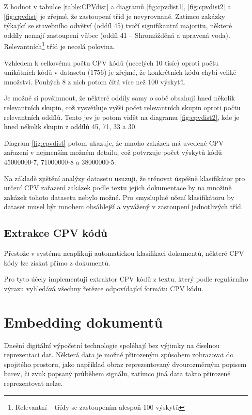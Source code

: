 \documentclass[thesis=M,czech]{FITthesis}[2019/12/23]
\begin{document}
Z hodnot v tabulce \ref{table:CPVdist} a diagramů \ref{fig:cpvdist1}, \ref{fig:cpvdist2} a \ref{fig:cpvdist} je zřejmé, že zastoupení tříd je nevyrovnané. Zatímco zakázky týkající se stavebního odvětví (oddíl 45) tvoří signifikantní majoritu, některé oddíly nemají zastoupení vůbec (oddíl 41 – Shromážděná a upravená voda). Relevantních\footnote{\label{not:relevant_class}Relevantní -- třídy se zastoupením alespoň 100 výskytů} tříd je necelá polovina.

Vzhledem k celkovému počtu CPV kódů (necelých 10 tisíc) oproti počtu unikátních kódů v datasetu (1756) je zřejmé, že konkrétních kódů chybí veliké množství. Pouhých 8 z nich potom čítá více než 100 výskytů.

Je možné si povšimnout, že některé oddíly samy o sobě obsahují hned několik relevantních skupin, což vysvětluje vyšší počet relevantních skupin oproti počtu relevantních oddílů. Tento jev je potom vidět na diagramu \ref{fig:cpvdist2}, kde je hned několik skupin z oddílů 45, 71, 33 a 30.

Diagram \ref{fig:cpvdist} potom ukazuje, že mnoho zakázek má uvedené CPV zařazení v nejmenším možném detailu, což potvrzuje počet výskytů kódů 45000000-7, 71000000-8 a 38000000-5.

Na základě zjištění analýzy datasetu usuzuji, že trénovat úspěšně klasifikátor pro určení CPV zařazení zakázek podle textu jejich dokumentace by na množině zakázek tohoto datasetu nebylo možné. Pro smysluplné učení klasifikátoru by dataset musel být mnohem obsáhlejší a vyvážený v zastoupení jednotlivých tříd.

\subsection{Extrakce CPV kódů}
\label{sec:cpv_extraction}

Přestože v systému neaplikuji automatickou klasifikaci dokumentů, některé CPV kódy lze získat přímo z dokumentů.

Pro tyto účely implementuji extraktor CPV kódů z textu, který podle regulárního výrazu vyhledává  všechny řetězce odpovídající formátu CPV kódu.


\section{Embedding dokumentů}
\label{sec:document_embedding}
Dnešní digitální výpočetní technologie spoléhají bez výjimky na číselnou reprezentaci dat. Některá data je možné přirozeným způsobem zobrazovat do spojitého prostoru, jako například obraz reprezentovaný dvourozměrným popisem barev, či zvuk popsaný průběhem signálu, zatímco jiná data takto přirozeně reprezentovat nelze.
\end{document}
